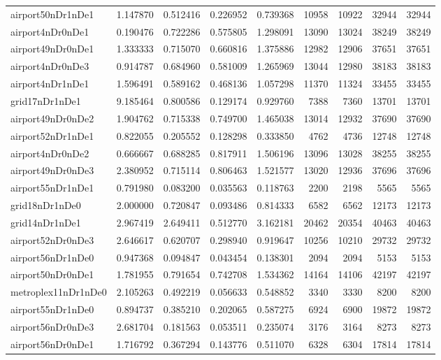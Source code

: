 \begin{longtable}{|l|r|r|r|r|r|r|r|r|}
airport50nDr1nDe1 & 1.147870 & 0.512416 & 0.226952 & 0.739368 & 10958 & 10922 & 32944 & 32944 \\
airport4nDr0nDe1 & 0.190476 & 0.722286 & 0.575805 & 1.298091 & 13090 & 13024 & 38249 & 38249 \\
airport49nDr0nDe1 & 1.333333 & 0.715070 & 0.660816 & 1.375886 & 12982 & 12906 & 37651 & 37651 \\
airport4nDr0nDe3 & 0.914787 & 0.684960 & 0.581009 & 1.265969 & 13044 & 12980 & 38183 & 38183 \\
airport4nDr1nDe1 & 1.596491 & 0.589162 & 0.468136 & 1.057298 & 11370 & 11324 & 33455 & 33455 \\
grid17nDr1nDe1 & 9.185464 & 0.800586 & 0.129174 & 0.929760 & 7388 & 7360 & 13701 & 13701 \\
airport49nDr0nDe2 & 1.904762 & 0.715338 & 0.749700 & 1.465038 & 13014 & 12932 & 37690 & 37690 \\
airport52nDr1nDe1 & 0.822055 & 0.205552 & 0.128298 & 0.333850 & 4762 & 4736 & 12748 & 12748 \\
airport4nDr0nDe2 & 0.666667 & 0.688285 & 0.817911 & 1.506196 & 13096 & 13028 & 38255 & 38255 \\
airport49nDr0nDe3 & 2.380952 & 0.715114 & 0.806463 & 1.521577 & 13020 & 12936 & 37696 & 37696 \\
airport55nDr1nDe1 & 0.791980 & 0.083200 & 0.035563 & 0.118763 & 2200 & 2198 & 5565 & 5565 \\
grid18nDr1nDe0 & 2.000000 & 0.720847 & 0.093486 & 0.814333 & 6582 & 6562 & 12173 & 12173 \\
grid14nDr1nDe1 & 2.967419 & 2.649411 & 0.512770 & 3.162181 & 20462 & 20354 & 40463 & 40463 \\
airport52nDr0nDe3 & 2.646617 & 0.620707 & 0.298940 & 0.919647 & 10256 & 10210 & 29732 & 29732 \\
airport56nDr1nDe0 & 0.947368 & 0.094847 & 0.043454 & 0.138301 & 2094 & 2094 & 5153 & 5153 \\
airport50nDr0nDe1 & 1.781955 & 0.791654 & 0.742708 & 1.534362 & 14164 & 14106 & 42197 & 42197 \\
metroplex11nDr1nDe0 & 2.105263 & 0.492219 & 0.056633 & 0.548852 & 3340 & 3330 & 8200 & 8200 \\
airport55nDr1nDe0 & 0.894737 & 0.385210 & 0.202065 & 0.587275 & 6924 & 6900 & 19872 & 19872 \\
airport56nDr0nDe3 & 2.681704 & 0.181563 & 0.053511 & 0.235074 & 3176 & 3164 & 8273 & 8273 \\
airport56nDr0nDe1 & 1.716792 & 0.367294 & 0.143776 & 0.511070 & 6328 & 6304 & 17814 & 17814 \\

\end{longtable}
